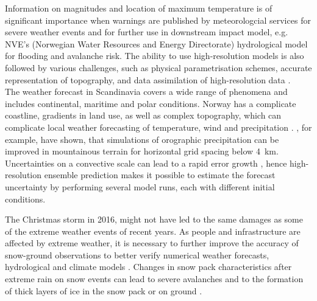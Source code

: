 Information on magnitudes and location of maximum temperature is of significant importance when warnings are published by meteorologcial services for severe weather events and for further use in downstream impact model, e.g. NVE's (Norwegian Water Resources and Energy Directorate) hydrological model for flooding and avalanche risk.
The ability to use high-resolution models is also followed by various challenges, such as physical parametrisation schemes, accurate representation of topography, and data assimilation of high-resolution data \citep{sun_convective-scale_2005}.
\\
The weather forecast in Scandinavia covers a wide range of phenomena and includes continental, maritime and polar conditions. Norway has a complicate coastline, gradients in land use, as well as complex topography, which can complicate local weather forecasting of temperature, wind and precipitation \citep{muller_arome-metcoop:_2017}. \citet{colle_1314_2005,garvert_1314_2005,schwartz_reproducing_2014}, for example, have shown, that simulations of orographic precipitation can be improved in mountainous terrain for horizontal grid spacing below \SI{4}{\km}. Uncertainties on a convective scale can lead to a rapid error growth \citep{lorenz_atmospheric_1969}, hence high-resolution ensemble prediction makes it possible to estimate the forecast uncertainty by performing several model runs, each with different initial conditions. %
\par\medskip
\noindent
The Christmas storm in 2016, might not have led to the same damages as some of the extreme weather events of recent years. As people and infrastructure are affected by extreme weather, it is necessary to further improve the accuracy of snow-ground observations to better verify numerical weather forecasts, hydrological and climate models \citep{joos_influence_2012}. Changes in snow pack characteristics after extreme rain on snow events can lead to severe avalanches \citep{stimberis_glide_2011} and to the formation of thick layers of ice in the snow pack or on ground \citep{putkonen_rain--snow_2003,hansen_climate_2011}.


